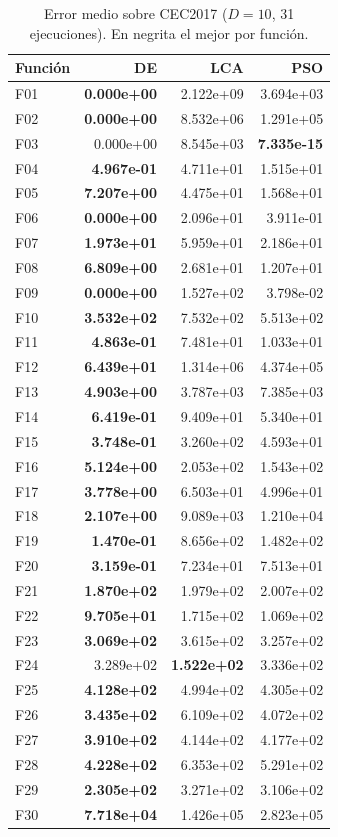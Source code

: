\begin{table}[h!]
\centering
\caption{Error medio sobre CEC2017 ($D=10$, 31 ejecuciones). En negrita el mejor por función.}
\label{tab:res_d10}
\footnotesize
\renewcommand{\arraystretch}{1.1}
\begin{tabular}{@{}lrrr@{}}
\toprule
\textbf{Función} & \textbf{DE} & \textbf{LCA} & \textbf{PSO} \\
\midrule
F01 & \textbf{0.000e+00} & 2.122e+09 & 3.694e+03 \\
F02 & \textbf{0.000e+00} & 8.532e+06 & 1.291e+05 \\
F03 & 0.000e+00 & 8.545e+03 & \textbf{7.335e-15} \\
F04 & \textbf{4.967e-01} & 4.711e+01 & 1.515e+01 \\
F05 & \textbf{7.207e+00} & 4.475e+01 & 1.568e+01 \\
F06 & \textbf{0.000e+00} & 2.096e+01 & 3.911e-01 \\
F07 & \textbf{1.973e+01} & 5.959e+01 & 2.186e+01 \\
F08 & \textbf{6.809e+00} & 2.681e+01 & 1.207e+01 \\
F09 & \textbf{0.000e+00} & 1.527e+02 & 3.798e-02 \\
F10 & \textbf{3.532e+02} & 7.532e+02 & 5.513e+02 \\
F11 & \textbf{4.863e-01} & 7.481e+01 & 1.033e+01 \\
F12 & \textbf{6.439e+01} & 1.314e+06 & 4.374e+05 \\
F13 & \textbf{4.903e+00} & 3.787e+03 & 7.385e+03 \\
F14 & \textbf{6.419e-01} & 9.409e+01 & 5.340e+01 \\
F15 & \textbf{3.748e-01} & 3.260e+02 & 4.593e+01 \\
F16 & \textbf{5.124e+00} & 2.053e+02 & 1.543e+02 \\
F17 & \textbf{3.778e+00} & 6.503e+01 & 4.996e+01 \\
F18 & \textbf{2.107e+00} & 9.089e+03 & 1.210e+04 \\
F19 & \textbf{1.470e-01} & 8.656e+02 & 1.482e+02 \\
F20 & \textbf{3.159e-01} & 7.234e+01 & 7.513e+01 \\
F21 & \textbf{1.870e+02} & 1.979e+02 & 2.007e+02 \\
F22 & \textbf{9.705e+01} & 1.715e+02 & 1.069e+02 \\
F23 & \textbf{3.069e+02} & 3.615e+02 & 3.257e+02 \\
F24 & 3.289e+02 & \textbf{1.522e+02} & 3.336e+02 \\
F25 & \textbf{4.128e+02} & 4.994e+02 & 4.305e+02 \\
F26 & \textbf{3.435e+02} & 6.109e+02 & 4.072e+02 \\
F27 & \textbf{3.910e+02} & 4.144e+02 & 4.177e+02 \\
F28 & \textbf{4.228e+02} & 6.353e+02 & 5.291e+02 \\
F29 & \textbf{2.305e+02} & 3.271e+02 & 3.106e+02 \\
F30 & \textbf{7.718e+04} & 1.426e+05 & 2.823e+05 \\
\bottomrule
\end{tabular}
\end{table}

